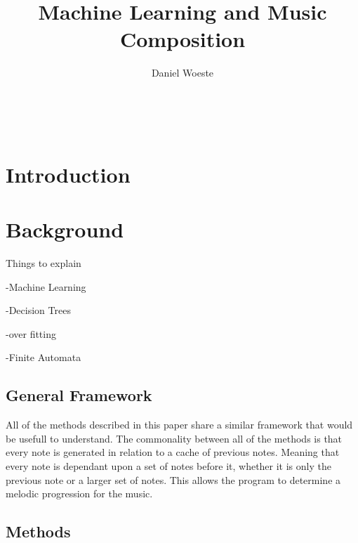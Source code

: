\documentclass{sig-alternate}
\begin{document}

\title{Machine Learning and Music Composition}
\author{
\alignauthor
Daniel Woeste\\
	\\
	\\
	\\
}



\maketitle
\begin{abstract}

\end{abstract}


\section{Introduction}
\label{sec:introduction}

\section{Background}
\label{sec:background}

Things to explain

-Machine Learning

-Decision Trees
	
	-over fitting

-Finite Automata

\subsection{General Framework}
\label{sec:framework}
	All of the methods described in this paper share a similar framework that would be usefull to understand. The commonality between all of the methods is that every note is generated in relation to a cache of previous notes. Meaning that every note is dependant upon a set of notes before it, whether it is only the previous note or a larger set of notes. This allows the program to determine a melodic progression for the music. 

\subsection{Methods}
\label{sec:methods}
\end{document}

